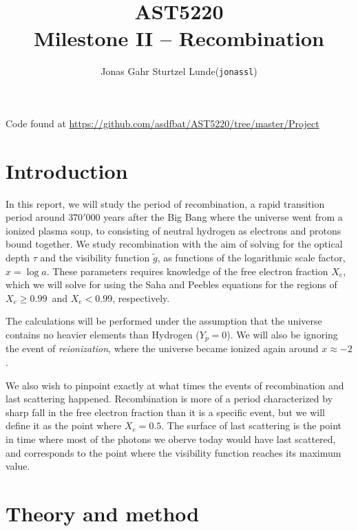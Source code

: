 \documentclass[10pt, a4paper]{article}
\begin{document}
\title{AST5220\\ Milestone II -- Recombination}
\author{
    \begin{tabular}{r l}
        Jonas Gahr Sturtzel Lunde & (\texttt{jonassl})
    \end{tabular}}

\maketitle
Code found at \url{https://github.com/asdfbat/AST5220/tree/master/Project}
\vspace{0.7cm}

\section{Introduction}
In this report, we will study the period of recombination, a rapid transition period around $370'000$ years after the Big Bang where the universe went from a ionized plasma soup, to consisting of neutral hydrogen as electrons and protons bound together. We study recombination with the aim of solving for the optical depth $\tau$ and the visibility function $\tilde{g}$, as functions of the logarithmic scale factor, $x = \log{a}$. These parameters requires knowledge of the free electron fraction $X_e$, which we will solve for using the Saha and Peebles equations for the regions of $X_e \geq 0.99$ and $X_e < 0.99$, respectively.

The calculations will be performed under the assumption that the universe contains no heavier elements than Hydrogen ($Y_p = 0$). We will also be ignoring the event of \textit{reionization}, where the universe became ionized again around $x\approx -2$.

We also wish to pinpoint exactly at what times the events of recombination and last scattering happened. Recombination is more of a period characterized by sharp fall in the free electron fraction than it is a specific event, but we will define it as the point where $X_e = 0.5$. The surface of last scattering is the point in time where most of the photons we oberve today would have last scattered, and corresponds to the point where the visibility function reaches its maximum value.


\section{Theory and method}
\end{document}
